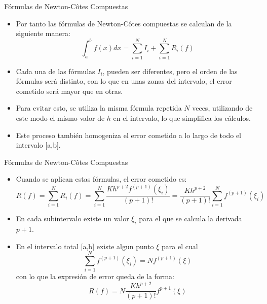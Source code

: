 \documentclass[12pt]{beamer}
\begin{document}
\begin{frame}{F\'ormulas de Newton-C\^otes Compuestas}
  \begin{itemize}
    \item Por tanto las f\'ormulas de Newton-C\^otes compuestas se calculan de la siguiente manera:
    $$
    \int_{a}^{b}f(x)dx = \sum_{i=1}^{N}I_i + \sum_{i=1}^NR_i(f)
    $$
    \begin{center}
  \end{center}
  \item<2-> Cada una de las fórmulas $I_i$, pueden ser diferentes, pero el orden de las fórmulas será distinto, con lo que en unas zonas del intervalo, el error cometido será mayor que en otras.
  \item<3-> Para evitar esto, se utiliza la misma fórmula repetida $N$ veces, utilizando de este modo el mismo valor de $h$ en el intervalo, lo que simplifica los cálculos.
  \item<4-> Este proceso también homogeniza el error cometido a lo largo de todo el intervalo [a,b].
  \end{itemize}
\end{frame}
\begin{frame}{F\'ormulas de Newton-C\^otes Compuestas}
  \begin{itemize}
    \item Cuando se aplican estas fórmulas, el error cometido es:
    {\small
    $$
    R(f) = \sum_{i=1}^{N}R_i(f) = \sum_{i=1}^{N}\dfrac{Kh^{p+2}f^{(p+1)}(\xi_i)}{(p+1)!} = \dfrac{Kh^{p+2}}{(p+1)!}\sum_{i=1}^{N}f^{(p+1)}(\xi_i)
    $$}
    \item<2-> En cada subintervalo existe un valor $\xi_i$ para el que se calcula la derivada $p+1$. 
    \item<3-> En el intervalo total [a,b] existe algun punto $\xi$ para el cual
    $$
    \sum_{i=1}^{N}f^{(p+1)}(\xi_i) = Nf^{(p+1)}(\xi)
    $$
    con lo que la expresión de error queda de la forma:
    $$
    R(f) = N\dfrac{Kh^{p+2}}{(p+1)!}f^{p+1}(\xi)
    $$
  \end{itemize}
\end{frame}
\end{document}
